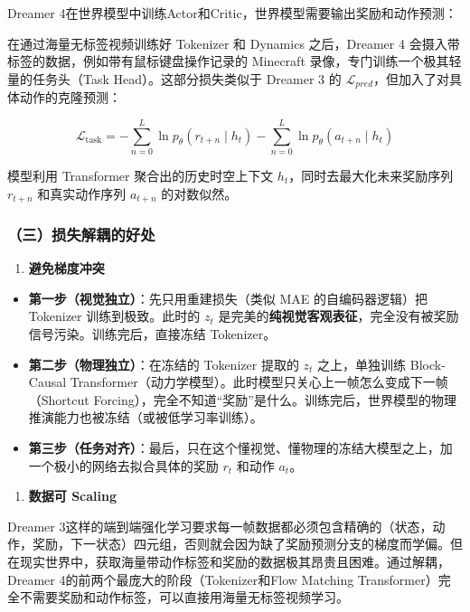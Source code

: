 Dreamer 4在世界模型中训练Actor和Critic，世界模型需要输出奖励和动作预测：

在通过海量无标签视频训练好 Tokenizer 和 Dynamics 之后，Dreamer 4 会摄入带标签的数据，例如带有鼠标键盘操作记录的 Minecraft 录像，专门训练一个极其轻量的任务头（Task Head）。这部分损失类似于 Dreamer 3 的 \(\mathcal{L}_{pred}\)，但加入了对具体动作的克隆预测：

\[
\mathcal{L}_{\mathrm{task}}=-\sum_{n=0}^{L}\ln p_{\theta}(r_{t+n}\mid h_t)-\sum_{n=0}^{L}\ln p_{\theta}(a_{t+n}\mid h_t)
\]

模型利用 Transformer 聚合出的历史时空上下文 \(h_t\)，同时去最大化未来奖励序列 \(r_{t+n}\) 和真实动作序列 \(a_{t+n}\) 的对数似然。

\hypertarget{ux4e09ux635fux5931ux89e3ux8026ux7684ux597dux5904}{%
\subsubsection{（三）损失解耦的好处}\label{ux4e09ux635fux5931ux89e3ux8026ux7684ux597dux5904}}

\begin{enumerate}
\def\labelenumi{\arabic{enumi}.}
\tightlist
\item
  \textbf{避免梯度冲突}
\end{enumerate}

\begin{itemize}
\tightlist
\item
  \textbf{第一步（视觉独立）}：先只用重建损失（类似 MAE 的自编码器逻辑）把 Tokenizer 训练到极致。此时的 \(z_t\) 是完美的\textbf{纯视觉客观表征}，完全没有被奖励信号污染。训练完后，直接冻结 Tokenizer。
\item
  \textbf{第二步（物理独立）}：在冻结的 Tokenizer 提取的 \(z_t\) 之上，单独训练 Block-Causal Transformer（动力学模型）。此时模型只关心上一帧怎么变成下一帧（Shortcut Forcing），完全不知道``奖励''是什么。训练完后，世界模型的物理推演能力也被冻结（或被低学习率训练）。
\item
  \textbf{第三步（任务对齐）}：最后，只在这个懂视觉、懂物理的冻结大模型之上，加一个极小的网络去拟合具体的奖励 \(r_t\) 和动作 \(a_t\)。
\end{itemize}

\begin{enumerate}
\def\labelenumi{\arabic{enumi}.}
\setcounter{enumi}{1}
\tightlist
\item
  \textbf{数据可 Scaling}
\end{enumerate}

Dreamer 3这样的端到端强化学习要求每一帧数据都必须包含精确的（状态，动作，奖励，下一状态）四元组，否则就会因为缺了奖励预测分支的梯度而学偏。但在现实世界中，获取海量带动作标签和奖励的数据极其昂贵且困难。通过解耦，Dreamer 4的前两个最庞大的阶段（Tokenizer和Flow Matching Transformer）完全不需要奖励和动作标签，可以直接用海量无标签视频学习。

